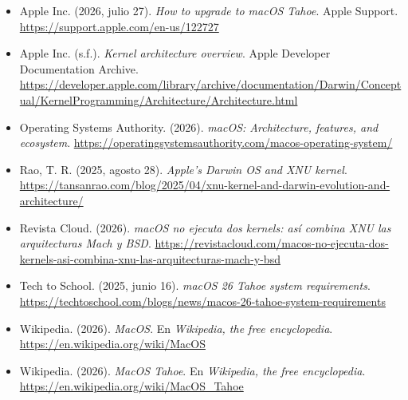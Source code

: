 \documentclass[12pt,letterpaper]{article}
\begin{document}
\begin{itemize}[leftmargin=1.5em,itemsep=8pt]

\item[] Apple Inc. (2026, julio 27). \textit{How to upgrade to macOS Tahoe}. Apple Support. \url{https://support.apple.com/en-us/122727}

\item[] Apple Inc. (s.f.). \textit{Kernel architecture overview}. Apple Developer Documentation Archive. \url{https://developer.apple.com/library/archive/documentation/Darwin/Conceptual/KernelProgramming/Architecture/Architecture.html}

\item[] Operating Systems Authority. (2026). \textit{macOS: Architecture, features, and ecosystem}. \url{https://operatingsystemsauthority.com/macos-operating-system/}

\item[] Rao, T. R. (2025, agosto 28). \textit{Apple's Darwin OS and XNU kernel}. \url{https://tansanrao.com/blog/2025/04/xnu-kernel-and-darwin-evolution-and-architecture/}

\item[] Revista Cloud. (2026). \textit{macOS no ejecuta dos kernels: así combina XNU las arquitecturas Mach y BSD}. \url{https://revistacloud.com/macos-no-ejecuta-dos-kernels-asi-combina-xnu-las-arquitecturas-mach-y-bsd}

\item[] Tech to School. (2025, junio 16). \textit{macOS 26 Tahoe system requirements}. \url{https://techtoschool.com/blogs/news/macos-26-tahoe-system-requirements}

\item[] Wikipedia. (2026). \textit{MacOS}. En \textit{Wikipedia, the free encyclopedia}. \url{https://en.wikipedia.org/wiki/MacOS}

\item[] Wikipedia. (2026). \textit{MacOS Tahoe}. En \textit{Wikipedia, the free encyclopedia}. \url{https://en.wikipedia.org/wiki/MacOS_Tahoe}

\end{itemize}
\end{document}
